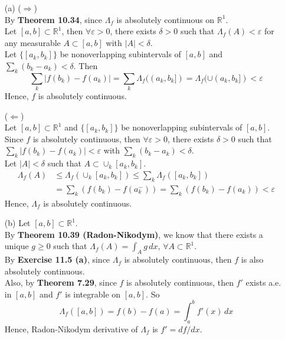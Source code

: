 \documentclass[a4paper,11pt]{article}
\begin{document}
	\begin{enumerate}
		\item[(a)]
			($\Rightarrow$)\\
				By \textbf{Theorem 10.34}, since $\Lambda_f$ is absolutely continuous on $\mathbb{R}^1$.\\
				Let $[a,b] \subset \mathbb{R}^1$, then $\forall \varepsilon > 0$, there exists $\delta > 0$ such that $\Lambda_f(A) < \varepsilon$ for any measurable $A \subset [a,b]$ with $|A| < \delta$.\\
				Let $\{[a_k,b_k]\}$ be nonoverlapping subintervals of $[a,b]$ and $\sum_k (b_k - a_k) < \delta$. Then
					$$\sum_k |f(b_k) - f(a_k)|
					= \sum_k \Lambda_f ((a_k,b_k])
					= \Lambda_f (\cup (a_k, b_k])
					< \varepsilon$$
				Hence, $f$ is absolutely continuous.\

			($\Leftarrow$)\\
				Let $[a,b] \subset \mathbb{R}^1$ and $\{[a_k,b_k]\}$ be nonoverlapping subintervals of $[a,b]$.\\
				Since $f$ is absolutely continuous, then $\forall \varepsilon > 0$, there exists $\delta > 0$ such that $\sum_k |f(b_k) - f(a_k)| < \varepsilon$ with $\sum_k (b_k - a_k) < \delta$.\\
				Let $|A| < \delta$ such that $A \subset \cup_k [a_k,b_k]$.
					$$\begin{aligned}
					\Lambda_f(A)
					&\leq \Lambda_f (\cup_k [a_k,b_k])
					\leq \sum_k \Lambda_f ([a_k,b_k])\\
					&= \sum_k (f(b_k) - f(a_k^-))
					= \sum_k (f(b_k) - f(a_k))
					< \varepsilon
					\end{aligned}$$
				Hence, $\Lambda_f$ is absolutely continuous.\\

		\item[(b)]
			Let $[a,b] \subset \mathbb{R}^1$.\\
			By \textbf{Theorem 10.39 (Radon-Nikodym)}, we know that there exists a unique $g \geq 0$ such that $\Lambda_f (A) = \int_A g\,dx$, $\forall A \subset \mathbb{R}^1$.\\
			By \textbf{Exercise 11.5 (a)}, since $\Lambda_f$ is absolutely continuous, then $f$ is also absolutely continuous.\\
			Also, by \textbf{Theorem 7.29}, since $f$ is absolutely continuous, then $f'$ exists a.e. in $[a,b]$ and $f'$ is integrable on $[a,b]$. So
				$$\Lambda_f([a,b])
				= f(b) - f(a)
				= \int_a^b f'(x)\,dx$$
			Hence, Radon-Nikodym derivative of $\Lambda_f$ is $f' = df/dx$.\\
	\end{enumerate}
\end{document}
